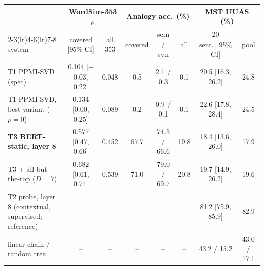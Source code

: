 \begin{tabular}{lccccccc}
\toprule
 & \multicolumn{2}{c}{WordSim-353 $\rho$} & \multicolumn{3}{c}{Analogy acc.\ (\%)} & \multicolumn{2}{c}{MST UUAS (\%)} \\
\cmidrule(lr){2-3}\cmidrule(lr){4-6}\cmidrule(lr){7-8}
system & covered [95\% CI] & all 353 & covered & sem / syn & all & 20 sent.\ [95\% CI] & pool \\
\midrule
T1 PPMI-SVD (spec) & 0.104 [$-$0.03, 0.22] & 0.048 & 0.5 & 2.1 / 0.3 & 0.1 & 20.5 [16.3, 26.2] & 24.8 \\
T1 PPMI-SVD, best variant ($p{=}0$) & 0.134 [0.00, 0.25] & 0.089 & 0.2 & 0.9 / 0.1 & 0.1 & 22.6 [17.8, 28.4] & 24.5 \\
\textbf{T3 BERT-static, layer 8} & 0.577 [0.47, 0.66] & 0.452 & 67.7 & 74.5 / 66.6 & 19.8 & 18.4 [13.6, 26.0] & 17.9 \\
T3 + all-but-the-top ($D{=}7$) & 0.682 [0.61, 0.74] & 0.539 & 71.0 & 79.0 / 69.7 & 20.8 & 19.7 [14.9, 26.2] & 19.6 \\
\midrule
T2 probe, layer 8 (contextual, supervised; reference) & -- & -- & -- & -- & -- & 81.2 [75.9, 85.9] & 82.9 \\
linear chain / random tree & -- & -- & -- & -- & -- & 43.2 / 15.2 & 43.0 / 17.1 \\
\bottomrule
\end{tabular}
